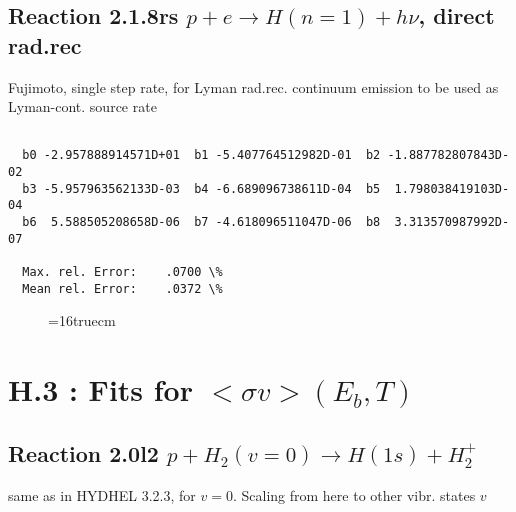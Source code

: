 \documentclass[12pt,dvipdfmx]{article}
\begin{document}
\subsection{
Reaction 2.1.8rs
 $ p + e \rightarrow H(n=1) + h\nu$, direct rad.rec
}
Fujimoto, single step rate, for Lyman rad.rec. continuum emission
to be used as Lyman-cont. source rate

\begin{small}\begin{verbatim}

  b0 -2.957888914571D+01  b1 -5.407764512982D-01  b2 -1.887782807843D-02
  b3 -5.957963562133D-03  b4 -6.689096738611D-04  b5  1.798038419103D-04
  b6  5.588505208658D-06  b7 -4.618096511047D-06  b8  3.313570987992D-07

  Max. rel. Error:    .0700 \%
  Mean rel. Error:    .0372 \%

\end{verbatim}\end{small}
\begin{figure} \label{2.1.8rs}
\epsfxsize=16truecm
\end{figure}
\newpage
\section{H.3 :  Fits for $<\sigma v> (E_b,T)$}

\subsection{
Reaction 2.0l2 $   p + H_2(v=0) \rightarrow H(1s) + H_2^+$}
same as in HYDHEL 3.2.3, for $v=0$. Scaling from here to other vibr. states $v$
\end{document}

